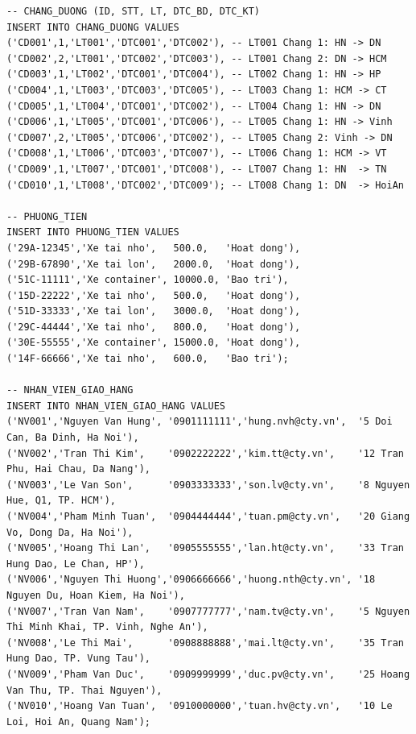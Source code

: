 \documentclass[11pt]{report}
\begin{document}
\begin{verbatim}
-- CHANG_DUONG (ID, STT, LT, DTC_BD, DTC_KT)
INSERT INTO CHANG_DUONG VALUES
('CD001',1,'LT001','DTC001','DTC002'), -- LT001 Chang 1: HN -> DN
('CD002',2,'LT001','DTC002','DTC003'), -- LT001 Chang 2: DN -> HCM
('CD003',1,'LT002','DTC001','DTC004'), -- LT002 Chang 1: HN -> HP
('CD004',1,'LT003','DTC003','DTC005'), -- LT003 Chang 1: HCM -> CT
('CD005',1,'LT004','DTC001','DTC002'), -- LT004 Chang 1: HN -> DN
('CD006',1,'LT005','DTC001','DTC006'), -- LT005 Chang 1: HN -> Vinh
('CD007',2,'LT005','DTC006','DTC002'), -- LT005 Chang 2: Vinh -> DN
('CD008',1,'LT006','DTC003','DTC007'), -- LT006 Chang 1: HCM -> VT
('CD009',1,'LT007','DTC001','DTC008'), -- LT007 Chang 1: HN  -> TN
('CD010',1,'LT008','DTC002','DTC009'); -- LT008 Chang 1: DN  -> HoiAn

-- PHUONG_TIEN
INSERT INTO PHUONG_TIEN VALUES
('29A-12345','Xe tai nho',   500.0,   'Hoat dong'),
('29B-67890','Xe tai lon',   2000.0,  'Hoat dong'),
('51C-11111','Xe container', 10000.0, 'Bao tri'),
('15D-22222','Xe tai nho',   500.0,   'Hoat dong'),
('51D-33333','Xe tai lon',   3000.0,  'Hoat dong'),
('29C-44444','Xe tai nho',   800.0,   'Hoat dong'),
('30E-55555','Xe container', 15000.0, 'Hoat dong'),
('14F-66666','Xe tai nho',   600.0,   'Bao tri');

-- NHAN_VIEN_GIAO_HANG
INSERT INTO NHAN_VIEN_GIAO_HANG VALUES
('NV001','Nguyen Van Hung', '0901111111','hung.nvh@cty.vn',  '5 Doi Can, Ba Dinh, Ha Noi'),
('NV002','Tran Thi Kim',    '0902222222','kim.tt@cty.vn',    '12 Tran Phu, Hai Chau, Da Nang'),
('NV003','Le Van Son',      '0903333333','son.lv@cty.vn',    '8 Nguyen Hue, Q1, TP. HCM'),
('NV004','Pham Minh Tuan',  '0904444444','tuan.pm@cty.vn',   '20 Giang Vo, Dong Da, Ha Noi'),
('NV005','Hoang Thi Lan',   '0905555555','lan.ht@cty.vn',    '33 Tran Hung Dao, Le Chan, HP'),
('NV006','Nguyen Thi Huong','0906666666','huong.nth@cty.vn', '18 Nguyen Du, Hoan Kiem, Ha Noi'),
('NV007','Tran Van Nam',    '0907777777','nam.tv@cty.vn',    '5 Nguyen Thi Minh Khai, TP. Vinh, Nghe An'),
('NV008','Le Thi Mai',      '0908888888','mai.lt@cty.vn',    '35 Tran Hung Dao, TP. Vung Tau'),
('NV009','Pham Van Duc',    '0909999999','duc.pv@cty.vn',    '25 Hoang Van Thu, TP. Thai Nguyen'),
('NV010','Hoang Van Tuan',  '0910000000','tuan.hv@cty.vn',   '10 Le Loi, Hoi An, Quang Nam');


\end{verbatim}
\end{document}
